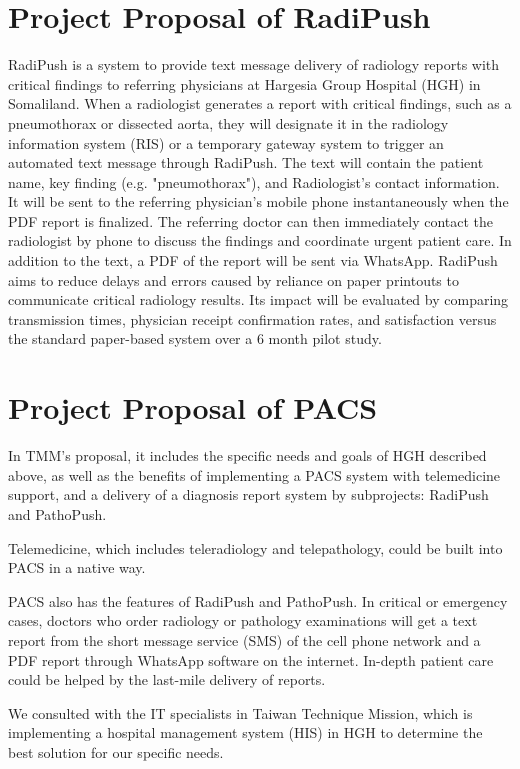 \documentclass{article}
\begin{document}
\section{Project Proposal of RadiPush}
RadiPush is a system to provide text message delivery of radiology reports with critical findings to referring physicians at Hargesia Group Hospital (HGH) in Somaliland. 
When a radiologist generates a report with critical findings, such as a pneumothorax or dissected aorta, they will designate it in the radiology information system (RIS) or a temporary gateway system to trigger an automated text message through RadiPush. 
The text will contain the patient name, key finding (e.g. "pneumothorax"), and Radiologist's contact information. It will be sent to the referring physician's mobile phone instantaneously when the PDF report is finalized. The referring doctor can then immediately contact the radiologist by phone to discuss the findings and coordinate urgent patient care. 
In addition to the text, a PDF of the report will be sent via WhatsApp. 
RadiPush aims to reduce delays and errors caused by reliance on paper printouts to communicate critical radiology results. Its impact will be evaluated by comparing transmission times, physician receipt confirmation rates, and satisfaction versus the standard paper-based system over a 6 month pilot study.


\section{Project Proposal of PACS}
In TMM's proposal, it includes the specific needs and goals of HGH described above, as well as the benefits of implementing a PACS system with telemedicine support, and a delivery of a diagnosis report system by subprojects: RadiPush and PathoPush. 

Telemedicine, which includes teleradiology and telepathology, could be built into PACS in a native way.

PACS also has the features of RadiPush and PathoPush. In critical or emergency cases, doctors who order radiology or pathology examinations will get a text report from the short message service (SMS) of the cell phone network and a PDF report through WhatsApp software on the internet. In-depth patient care could be helped by the last-mile delivery of reports.

We consulted with the IT specialists in Taiwan Technique Mission, which is implementing a hospital management system (HIS) in HGH to determine the best solution for our specific needs.
\end{document}
